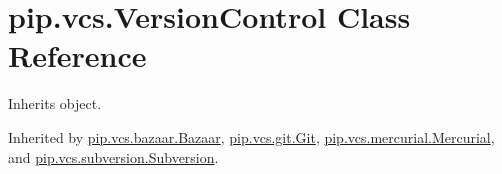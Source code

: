 \hypertarget{classpip_1_1vcs_1_1_version_control}{}\section{pip.\+vcs.\+Version\+Control Class Reference}
\label{classpip_1_1vcs_1_1_version_control}


Inherits object.



Inherited by \hyperlink{classpip_1_1vcs_1_1bazaar_1_1_bazaar}{pip.\+vcs.\+bazaar.\+Bazaar}, \hyperlink{classpip_1_1vcs_1_1git_1_1_git}{pip.\+vcs.\+git.\+Git}, \hyperlink{classpip_1_1vcs_1_1mercurial_1_1_mercurial}{pip.\+vcs.\+mercurial.\+Mercurial}, and \hyperlink{classpip_1_1vcs_1_1subversion_1_1_subversion}{pip.\+vcs.\+subversion.\+Subversion}.

